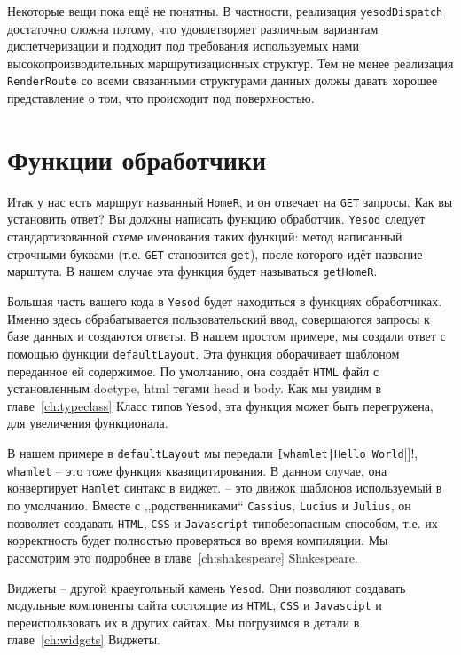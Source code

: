 Некоторые вещи пока ещё не понятны. В частности, реализация \lstinline!yesodDispatch!
достаточно сложна потому, что удовлетворяет различным вариантам диспетчеризации
и подходит под требования используемых нами высокопроизводительных 
маршрутизационных структур.
Тем не менее реализация \lstinline!RenderRoute! со всеми связанными 
структурами данных должы давать хорошее представление о том, что происходит 
под поверхностью. %

\section{Функции обработчики}

Итак у нас есть маршрут названный \lstinline!HomeR!, и он отвечает на \texttt{GET} запросы. 
Как вы установить ответ? Вы должны написать функцию обработчик. \texttt{Yesod} следует
стандартизованной схеме именования таких функций: 
метод написанный строчными буквами (т.е. \texttt{GET} становится \lstinline!get!), после которого идёт 
название марштута. В нашем случае эта функция будет называться \lstinline!getHomeR!.

Большая часть вашего кода в \texttt{Yesod} будет находиться в функциях обработчиках. 
Именно здесь обрабатывается пользовательский ввод, совершаются запросы к базе данных и создаются ответы. 
В нашем простом примере, мы создали ответ с помощью функции \lstinline!defaultLayout!. 
Эта функция оборачивает шаблоном переданное ей содержимое.  По умолчанию, 
она создаёт \texttt{HTML} файл с установленным doctype, html тегами head и body. 
Как мы увидим в главе~\ref{ch:typeclass} Класс типов \texttt{Yesod}, 
эта функция может быть перегружена, для увеличения функционала.

В нашем примере в \lstinline!defaultLayout! мы передали 
\lstinline![whamlet|Hello World!|]!, \lstinline!whamlet! -- это тоже 
функция квазицитирования. В данном случае, она конвертирует 
\texttt{Hamlet} синтакс в виджет.  -- это движок 
 шаблонов используемый в  по умолчанию. 
Вместе с ,,родственниками`` \texttt{Cassius}, \texttt{Lucius} 
и \texttt{Julius}, он позволяет создавать \texttt{HTML}, \texttt{CSS}
и \texttt{Javascript} типобезопасным способом, т.е. их корректность будет 
полностью проверяться во время компиляции. Мы рассмотрим это подробнее в 
главе~\ref{ch:shakespeare} Shakespeare.

Виджеты -- другой краеугольный камень \texttt{Yesod}. Они позволяют создавать 
модульные компоненты сайта состоящие из \texttt{HTML}, \texttt{CSS} и 
\texttt{Javascipt} и переиспользовать их в других сайтах. 
Мы погрузимся в детали в главе~\ref{ch:widgets} Виджеты.

